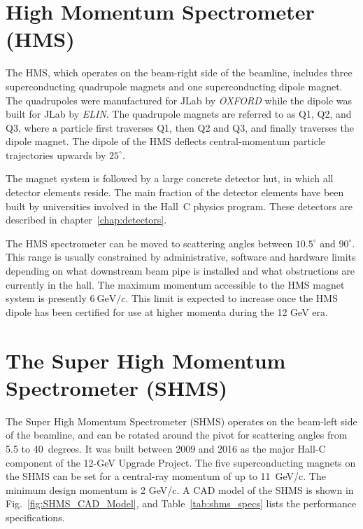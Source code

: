 {%

\section{High Momentum Spectrometer (HMS) }

The HMS, which operates on the beam-right side of the beamline,
includes three superconducting quadrupole magnets and one superconducting dipole magnet. The quadrupoles were
manufactured for JLab by {\em OXFORD} while the dipole was built for
JLab by {\em ELIN}.  The quadrupole magnets are referred to as Q1, Q2,
and Q3, where a particle first traverses Q1, then Q2 and Q3, and
finally traverses the dipole magnet. The dipole of the HMS deflects central-momentum
particle trajectories upwards by $25^{\circ}$.


The magnet system is followed by a large concrete detector hut, in which all
detector elements reside. The main fraction of the detector elements have been
built by universities involved in the Hall~C physics program.  These
detectors are described in chapter~\ref{chap:detectors}.

The HMS spectrometer can be moved to scattering angles between
$10.5^{\circ}$ and $90^{\circ}$. This range is usually constrained by
administrative, software and hardware limits depending on what
downstream beam pipe is installed and what obstructions are currently in the hall.  The
maximum momentum accessible to the HMS magnet
system is presently $6~\textrm{GeV}/c$. This limit is expected to increase
once the HMS dipole has been certified for use at higher momenta during
the 12 GeV era.

\section{The Super High Momentum Spectrometer (SHMS)}

The Super High Momentum Spectrometer (SHMS) operates on the beam-left
side of the beamline, and can be rotated around the pivot for scattering angles from 5.5
to 40~degrees. It was built between 2009 and 2016 as the major
Hall-C component of the 12-GeV Upgrade Project.  The five superconducting
magnets on the SHMS can be set for a central-ray momentum of up to 11~GeV/c.
The minimum design momentum is 2 GeV/c. A CAD model of the SHMS is shown
in Fig.~\ref{fig:SHMS_CAD_Model}, and Table~\ref{tab:shms_specs} lists the performance specifications.

}
